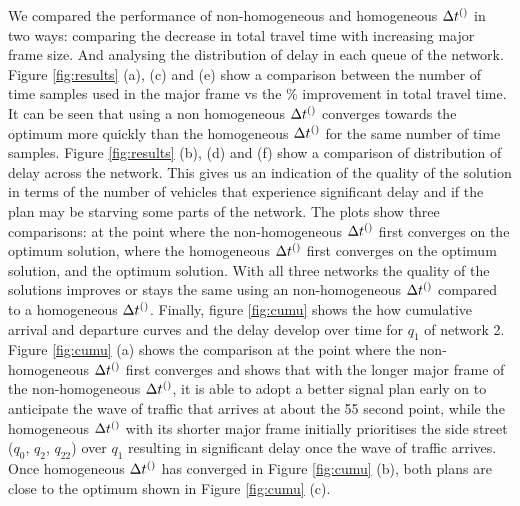 We compared the performance of non-homogeneous and homogeneous $\DT[]$ in two ways: comparing the decrease in total travel time with increasing major frame size. And analysing the distribution of delay in each queue of the network. Figure \ref{fig:results} (a), (c) and (e) show a comparison between the number of time samples used in the major frame vs the \% improvement in total travel time. It can be seen that using a non homogeneous $\DT[]$ converges towards the optimum more quickly than the homogeneous $\DT[]$ for the same number of time samples. Figure \ref{fig:results} (b), (d) and (f) show a comparison of distribution of delay across the network. This gives us an indication of the quality of the solution in terms of the number of vehicles that experience significant delay and if the plan may be starving some parts of the network.  The plots show three comparisons: at the point where the non-homogeneous $\DT[]$ first converges on the optimum solution, where the homogeneous $\DT[]$ first converges on the optimum solution, and the optimum solution. With all three networks the quality of the solutions improves or stays the same using an non-homogeneous $\DT[]$ compared to a homogeneous $\DT[]$.
Finally, figure \ref{fig:cumu} shows the how cumulative arrival and departure curves and the delay develop over time for $q_1$ of network 2. Figure \ref{fig:cumu} (a) shows the comparison at the point where the non-homogeneous $\DT[]$ first converges and shows that with the longer major frame of the non-homogeneous $\DT[]$, it is able to adopt a better signal plan early on to anticipate the wave of traffic that arrives at about the 55 second point, while the homogeneous $\DT[]$ with its shorter major frame initially prioritises the side street ($q_0$, $q_2$, $q_{22}$) over $q_1$ resulting in significant delay once the wave of traffic arrives. Once homogeneous $\DT[]$ has converged in Figure \ref{fig:cumu} (b), both plans are close to the optimum shown in Figure \ref{fig:cumu} (c).

